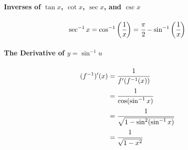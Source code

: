 \documentclass{article}
\begin{document}
            \paragraph{Inverses of $\tan x$, $\cot x$, $\sec x$, and $\csc x$}
            \[\sec^{-1}x=\cos ^{-1}\bigg(\cfrac{1}{x}\bigg)=\cfrac{\pi}{2}-\sin^{-1}\bigg(\cfrac{1}{x}\bigg)\]
            \paragraph{The Derivative of $y=\sin ^{-1} u$}
            \begin{equation}
                \begin{aligned}
                    (f^{-1})'(x)&=\cfrac{1}{f'(f^{-1}(x))}\\
                    &=\cfrac{1}{\cos (\sin ^{-1}x)}\\
                    &=\cfrac{1}{\sqrt{1-\sin ^2(\sin ^{-1}x)}}\\
                    &=\cfrac{1}{\sqrt{1-x^2}}
                \end{aligned}
            \end{equation}
\end{document}
